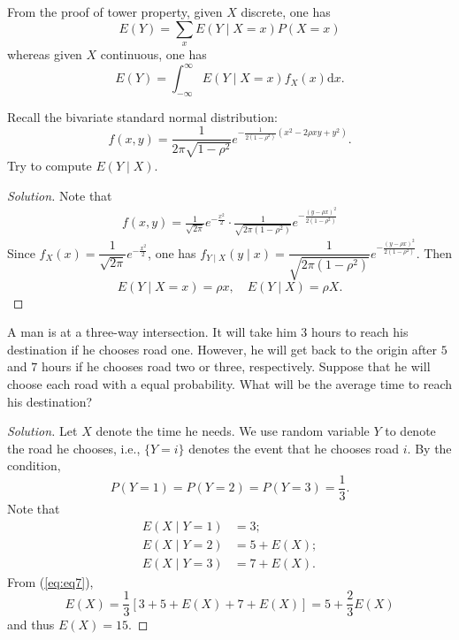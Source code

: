 \documentclass[11pt,singlecolumn, openany, citestyle=authoryear]{elegantbook}
\begin{document}
\begin{CJK}{UTF8}{gbsn}
\begin{corollary}
    From the proof of tower property, given $X$ discrete, one has 
    \begin{equation}\label{eq:eq7}
        E(Y)=\sum_{x} E(Y\mid X=x)P(X=x)
    \end{equation}
    whereas given $X$ continuous, one has
    \begin{equation}
        E(Y)=\int_{-\infty}^\infty E(Y\mid X=x) f_X(x)\mathrm{d}x.
    \end{equation}
\end{corollary}

\begin{example}
    Recall the bivariate standard normal distribution:
    $$
    f(x,y)=\frac{1}{2\pi\sqrt{1-\rho^2}}e^{-\frac{1}{2(1-\rho^2)}(x^2-2\rho xy + y^2)}.
    $$
    Try to compute $E(Y\mid X)$.
\end{example}
\begin{proof}[Solution]
    Note that 
    \begin{align*}
        f(x,y)=\frac{1}{\sqrt{2\pi}}e^{-\frac{x^2}{2}}\cdot
        \frac{1}{\sqrt{2\pi(1-\rho^2)}}e^{-\frac{(y-\rho x)^2}{2(1-\rho^2)}}
    \end{align*}
    Since $f_X(x)=\dfrac{1}{\sqrt{2\pi}}e^{-\frac{x^2}{2}}$, one has 
    $f_{Y\mid X}(y\mid x)=\dfrac{1}{\sqrt{2\pi(1-\rho^2)}}
    e^{-\frac{(y-\rho x)^2}{2(1-\rho^2)}}$. Then 
    $$
    E(Y\mid X= x)=\rho x, \quad E(Y\mid X)=\rho X.
    $$
\end{proof}

\begin{example}
    A man is at a three-way intersection. It will take him $3$ hours to reach 
    his destination if he chooses road one. However, 
    he will get back to the origin after $5$ and $7$ hours if he chooses road
    two or three, respectively. Suppose that 
    he will choose each road with a equal probability. What will be the average time 
    to reach his destination?
\end{example}
\begin{proof}[Solution]
    Let $X$ denote the time he needs.
    We use random variable $Y$ to denote the road he chooses, i.e., 
    $\{Y=i\}$ denotes the event that he chooses road $i$. By the condition, 
    $$
    P(Y=1)=P(Y=2)=P(Y=3)=\frac{1}{3}.
    $$
    Note that 
    \begin{align*}
        E(X\mid Y=1)&= 3;\\
        E(X\mid Y=2)&=5+E(X);\\
        E(X\mid Y=3)&= 7+E(X).
    \end{align*}
    From (\ref{eq:eq7}),
    $$
    E(X)=\frac{1}{3}[3+5+E(X)+7+E(X)]=5+\frac{2}{3}E(X)
    $$
    and thus $E(X)=15$.
\end{proof}


\end{CJK}
\end{document}
